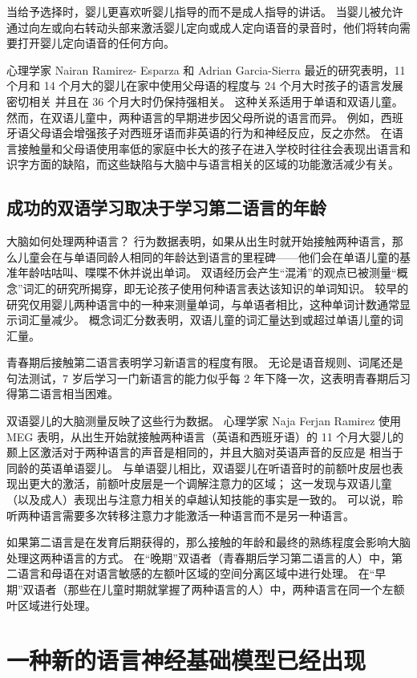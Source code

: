 当给予选择时，婴儿更喜欢听婴儿指导的而不是成人指导的讲话。 当婴儿被允许通过向左或向右转动头部来激活婴儿定向或成人定向语音的录音时，他们将转向需要打开婴儿定向语音的任何方向。

心理学家 Nairan Ramirez- Esparza 和 Adrian Garcia-Sierra 最近的研究表明，11 个月和 14 个月大的婴儿在家中使用父母语的程度与 24 个月大时孩子的语言发展密切相关 并且在 36 个月大时仍保持强相关。 这种关系适用于单语和双语儿童。 然而，在双语儿童中，两种语言的早期进步因父母所说的语言而异。 例如，西班牙语父母语会增强孩子对西班牙语而非英语的行为和神经反应，反之亦然。 在语言接触量和父母语使用率低的家庭中长大的孩子在进入学校时往往会表现出语言和识字方面的缺陷，而这些缺陷与大脑中与语言相关的区域的功能激活减少有关。

\subsection{成功的双语学习取决于学习第二语言的年龄}

大脑如何处理两种语言？ 行为数据表明，如果从出生时就开始接触两种语言，那么儿童会在与单语同龄人相同的年龄达到语言的里程碑——他们会在单语儿童的基准年龄咕咕叫、喋喋不休并说出单词。 双语经历会产生“混淆”的观点已被测量“概念”词汇的研究所揭穿，即无论孩子使用何种语言表达该知识的单词知识。 较早的研究仅用婴儿两种语言中的一种来测量单词，与单语者相比，这种单词计数通常显示词汇量减少。 概念词汇分数表明，双语儿童的词汇量达到或超过单语儿童的词汇量。

青春期后接触第二语言表明学习新语言的程度有限。 无论是语音规则、词尾还是句法测试，7 岁后学习一门新语言的能力似乎每 2 年下降一次，这表明青春期后习得第二语言相当困难。

双语婴儿的大脑测量反映了这些行为数据。 心理学家 Naja Ferjan Ramirez 使用 MEG 表明，从出生开始就接触两种语言（英语和西班牙语）的 11 个月大婴儿的颞上区激活对于两种语言的声音是相同的，并且大脑对英语声音的反应是 相当于同龄的英语单语婴儿。 与单语婴儿相比，双语婴儿在听语音时的前额叶皮层也表现出更大的激活，前额叶皮层是一个调解注意力的区域； 这一发现与双语儿童（以及成人）表现出与注意力相关的卓越认知技能的事实是一致的。 可以说，聆听两种语言需要多次转移注意力才能激活一种语言而不是另一种语言。

如果第二语言是在发育后期获得的，那么接触的年龄和最终的熟练程度会影响大脑处理这两种语言的方式。 在“晚期”双语者（青春期后学习第二语言的人）中，第二语言和母语在对语言敏感的左额叶区域的空间分离区域中进行处理。 在“早期”双语者（那些在儿童时期就掌握了两种语言的人）中，两种语言在同一个左额叶区域进行处理。


\section{一种新的语言神经基础模型已经出现}
